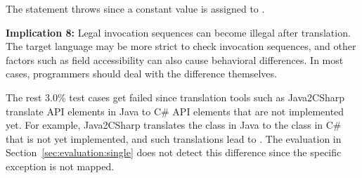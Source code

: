 The  statement throws  since a constant value is assigned to .

\textbf{Implication 8:} Legal invocation sequences can become illegal after translation. The target language may be more strict to check invocation sequences, and other factors such as field accessibility can also cause behavioral differences. In most cases, programmers should deal with the difference themselves.

The rest 3.0\% test cases get failed since translation tools such as Java2CSharp translate API elements in Java to C\# API elements that are not implemented yet. For example, Java2CSharp translates the  class in Java to the  class in C\# that is not yet implemented, and such translations lead to . The evaluation in Section~\ref{sec:evaluation:single} does not detect this difference since the specific exception is not mapped.

